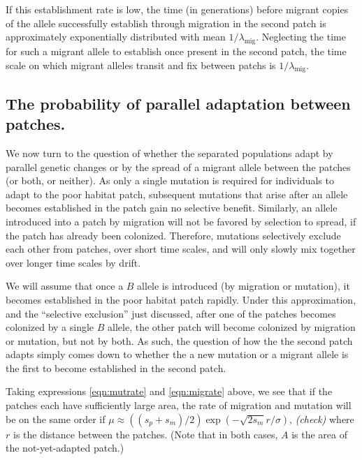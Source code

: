 \documentclass{article}
\newcommand{\migrate}{\lambda_\text{mig}}
\newcommand{\plr}[1]{{\it\color{blue}(#1)}}
\begin{document}
If this establishment rate is low, 
the time (in generations) before migrant copies of the allele successfully establish through migration in the second patch
is approximately exponentially distributed with mean $1/\migrate$.
Neglecting the time for such a migrant allele to establish once present in the second patch,
the time scale on which migrant alleles transit and fix between patchs is $1/\migrate$.


\subsection{The probability of parallel adaptation between patches.} 
\label{ss:probparallel}

We now turn to the question of whether the separated populations adapt by parallel genetic changes 
or by the spread of a migrant allele between the patches
(or both, or neither).
As only a single mutation is required for individuals to adapt to the
poor habitat patch, subsequent mutations that arise after an allele becomes established in the patch gain no selective benefit. 
Similarly, an allele introduced into a patch by migration will not be favored by selection to spread, 
if the patch has already been colonized. 
Therefore, mutations selectively exclude each other from patches, over short time scales, 
and will only slowly mix together over longer time scales by drift. 

We will assume that once a $B$ allele is introduced (by migration or mutation), 
it becomes established in the poor habitat patch rapidly. 
Under this approximation, and the ``selective exclusion'' just discussed,
after one of the patches becomes colonized by a single $B$ allele, 
the other patch will become colonized by migration or mutation, but not by both. 
As such, the question of how the the second patch adapts
simply comes down to whether the a new mutation or a migrant allele is the first to become established in the second patch. 

Taking expressions \eqref{eqn:mutrate} and \eqref{eqn:migrate} above,
we see that if the patches each have sufficiently large area,
the rate of migration and mutation will be on the same order if 
$\mu \approx ((s_p+s_m)/2) \exp(-\sqrt{2 s_m} r / \sigma)$,
\plr{check}
where $r$ is the distance between the patches.
(Note that in both cases, $A$ is the area of the not-yet-adapted patch.)
\end{document}
